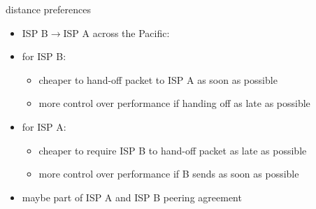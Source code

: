\begin{frame}{distance preferences}
    \begin{itemize}
    \item ISP B$\rightarrow$ISP A across the Pacific:
    \vspace{.5cm}
    \item for ISP B:
        \begin{itemize}
        \item cheaper to hand-off packet to ISP A as soon as possible
        \item more control over performance if handing off as late as possible
        \end{itemize}
    \item for ISP A:
        \begin{itemize}
        \item cheaper to require ISP B to hand-off packet as late as possible
        \item more control over performance if B sends as soon as possible
        \end{itemize}
    \item maybe part of ISP A and ISP B peering agreement
    \end{itemize}
\end{frame}

